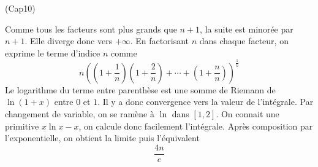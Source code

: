 \begin{tiny}(Cap10)\end{tiny} Comme tous les facteurs sont plus grands que $n+1$, la suite est minorée par $n+1$. Elle diverge donc vers $+\infty$. En factorisant $n$ dans chaque facteur, on exprime le terme d'indice $n$ comme
\begin{displaymath}
 n\left( (1+\frac{1}{n})(1+\frac{2}{n})+\cdots +(1+\frac{n}{n})\right) ^{\frac{1}{n}}
\end{displaymath}
 Le logarithme du terme entre parenthèse est une somme de Riemann de $\ln(1+x)$ entre $0$ et $1$. Il y a donc convergence vers la valeur de l'intégrale. Par changement de variable, on se ramène à $\ln$ dans $[1,2]$. On connait une primitive $x\ln x -x$, on calcule donc facilement l'intégrale. Après composition par l'exponentielle, on obtient la limite puis l'équivalent
\begin{displaymath}
 \frac{4n}{e}
\end{displaymath}
